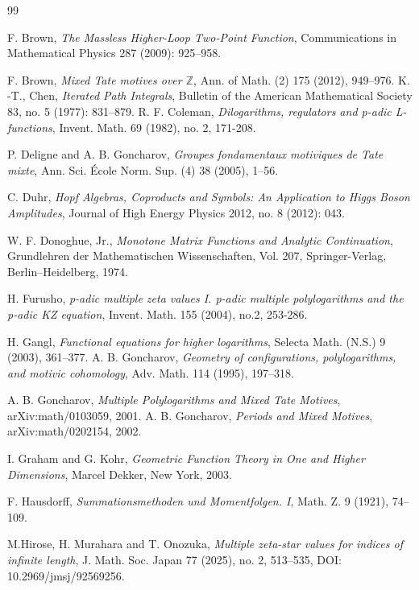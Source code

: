\documentclass[12pt,a4paper]{amsart}
\numberwithin{equation}{section}
\theoremstyle{plain}
\theoremstyle{definition}
\begin{document}
 
\begin{thebibliography}{99}

F. Brown,  \emph{The Massless Higher-Loop Two-Point Function}, Communications in Mathematical Physics 287 (2009): 925–958. 

F. Brown,
\emph{Mixed Tate motives over $\mathbb{Z}$},
Ann. of Math. (2) 175 (2012), 949--976.
K. -T., Chen,  \emph{Iterated Path Integrals}, Bulletin of the American Mathematical Society 83, no. 5 (1977): 831–879. 
R. F. Coleman, \emph{Dilogarithms, regulators and p-adic L-functions}, Invent. Math. 69 (1982), no. 2, 171-208.

P. Deligne and A. B. Goncharov,
\emph{Groupes fondamentaux motiviques de Tate mixte},
Ann. Sci. \'{E}cole Norm. Sup. (4) 38 (2005), 1--56.

C. Duhr,  \emph{Hopf Algebras, Coproducts and Symbols: An Application to Higgs Boson Amplitudes}, Journal of High Energy Physics 2012, no. 8 (2012): 043. 




W. F. Donoghue, Jr.,
\emph{Monotone Matrix Functions and Analytic Continuation},
Grundlehren der Mathematischen Wissenschaften, Vol. 207,
Springer-Verlag, Berlin--Heidelberg, 1974.

H. Furusho, \emph{p-adic multiple zeta values I. p-adic multiple polylogarithms and the p-adic KZ equation}, Invent. Math. 155 (2004), no.2, 253-286.

H. Gangl,
\emph{Functional equations for higher logarithms},
Selecta Math. (N.S.) 9 (2003), 361--377.
A. B. Goncharov,
\emph{Geometry of configurations, polylogarithms, and motivic cohomology},
Adv. Math. 114 (1995), 197--318.

A. B. Goncharov, \emph{Multiple Polylogarithms and Mixed Tate Motives}, arXiv:math/0103059, 2001.
A. B. Goncharov, \emph{Periods and Mixed Motives}, arXiv:math/0202154, 2002.





I. Graham and G. Kohr,
\emph{Geometric Function Theory in One and Higher Dimensions},
Marcel Dekker, New York, 2003.

F. Hausdorff,
\emph{Summationsmethoden und Momentfolgen. I},
Math. Z. 9 (1921), 74--109.

M.Hirose, H. Murahara and T. Onozuka,
\emph{Multiple zeta-star values for indices of infinite length},
J. Math. Soc. Japan 77 (2025), no. 2, 513--535,
DOI: 10.2969/jmsj/92569256.


\end{thebibliography}
\end{document}
